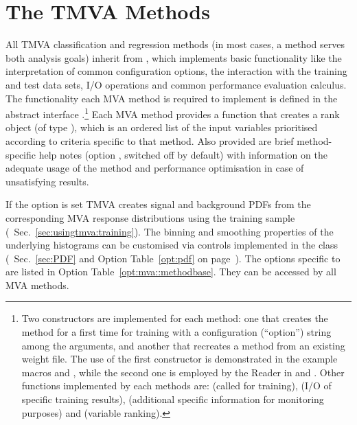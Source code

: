 \section{The TMVA Methods}
\label{sec:tmvaClassifiers}

All TMVA classification and regression methods (in most cases, a method serves both 
analysis goals) inherit from , which implements basic 
functionality like the interpretation of common configuration options, the 
interaction with the training and test data sets, I/O operations and common 
performance evaluation calculus. The functionality each MVA method is required 
to implement is defined in the abstract interface .\footnote 
{ 
  Two constructors are
  implemented for each method: one that creates the method for
  a first time for training with a configuration (``option'') string
  among the arguments, and another that recreates a method from an
  existing weight file. The use of the first constructor is
  demonstrated in the example macros  and
  , while the second one is employed by the Reader in 
   and .
  Other functions implemented by each methods are: 
  (called for training),  (I/O of
  specific training results), 
  (additional specific information for monitoring purposes) and 
   (variable ranking).  
} 
Each MVA method provides a function that creates a rank object (of 
type ), which is an ordered list of the input variables 
prioritised according to criteria specific to that method. Also 
provided are brief method-specific help notes (option , 
switched off by default) with information on the adequate usage of 
the method and performance optimisation in case of unsatisfying 
results.

If the option  is set TMVA creates signal and
background PDFs from the corresponding MVA response
distributions using the training sample (\cf\
Sec.~\ref{sec:usingtmva:training}). The binning and smoothing
properties of the underlying histograms can be customised via controls
implemented in the \code{PDF} class (\cf\ Sec.~\ref{sec:PDF} and Option 
Table~\ref{opt:pdf} on page~\pageref{opt:pdf}). The options specific to
\code{MethodBase} are listed in Option Table~\ref{opt:mva::methodbase}. 
They can be accessed by all MVA methods. 

